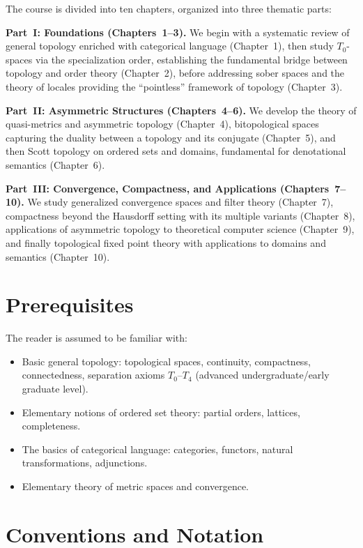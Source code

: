 The course is divided into ten chapters, organized into three thematic parts:

\medskip
\noindent\textbf{Part~I: Foundations (Chapters~1--3).}
We begin with a systematic review of general topology enriched with categorical language
(Chapter~1), then study $T_0$-spaces via the specialization order, establishing the
fundamental bridge between topology and order theory (Chapter~2), before addressing sober
spaces and the theory of locales providing the ``pointless'' framework of topology
(Chapter~3).

\medskip
\noindent\textbf{Part~II: Asymmetric Structures (Chapters~4--6).}
We develop the theory of quasi-metrics and asymmetric topology (Chapter~4), bitopological
spaces capturing the duality between a topology and its conjugate (Chapter~5), and then
Scott topology on ordered sets and domains, fundamental for denotational semantics
(Chapter~6).

\medskip
\noindent\textbf{Part~III: Convergence, Compactness, and Applications (Chapters~7--10).}
We study generalized convergence spaces and filter theory (Chapter~7), compactness beyond
the Hausdorff setting with its multiple variants (Chapter~8), applications of asymmetric
topology to theoretical computer science (Chapter~9), and finally topological fixed point
theory with applications to domains and semantics (Chapter~10).

\section*{Prerequisites}

The reader is assumed to be familiar with:
\begin{itemize}
  \item Basic general topology: topological spaces, continuity, compactness, connectedness,
    separation axioms $T_0$--$T_4$ (advanced undergraduate/early graduate level).
  \item Elementary notions of ordered set theory: partial orders, lattices, completeness.
  \item The basics of categorical language: categories, functors, natural transformations,
    adjunctions.
  \item Elementary theory of metric spaces and convergence.
\end{itemize}

\section*{Conventions and Notation}

